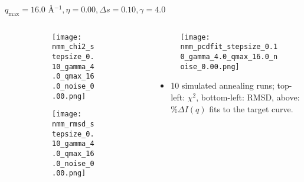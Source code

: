 \documentclass{beamer}
\begin{document}
\begin{frame}{$ q_{\textrm{max}}=16.0 $ \AA $^{-1}, \eta=0.00, \Delta s=0.10, \gamma=4.0$}
	\begin{columns}
		\begin{column}{.5\textwidth}
			\begin{figure}[H]
			\centering
			\begin{subfigure}[b]{\textwidth}
				\centering
				\texttt{[image: nmm\_chi2\_stepsize\_0.10\_gamma\_4.0\_qmax\_16.0\_noise\_0.00.png]}
				\label{fig:}
			\end{subfigure}
			\begin{subfigure}[b]{\textwidth}
				\centering
				\texttt{[image: nmm\_rmsd\_stepsize\_0.10\_gamma\_4.0\_qmax\_16.0\_noise\_0.00.png]}
				\label{fig:}
			\end{subfigure}
			\end{figure}
		\end{column}
		\begin{column}{.5\textwidth}
			\begin{figure}[H]
				\centering
				\texttt{[image: nmm\_pcdfit\_stepsize\_0.10\_gamma\_4.0\_qmax\_16.0\_noise\_0.00.png]}
				\label{fig:}
			\end{figure}
			\begin{itemize}
				\item 10 simulated annealing runs; top-left: $\chi^2$, bottom-left: RMSD, above: $\%\Delta I(q)$ fits to the target curve.
			\end{itemize}
		\end{column}
	\end{columns}
\end{frame}
 
\end{document}
